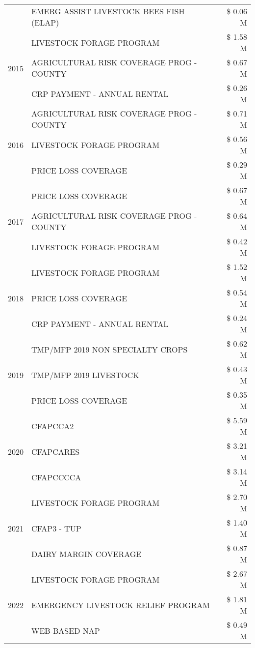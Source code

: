 \begin{tabular}{llr}
 & EMERG ASSIST LIVESTOCK BEES FISH (ELAP) & \$ 0.06 M \\
\cline{1-3}
\multirow[t]{3}{*}{2015} & LIVESTOCK FORAGE PROGRAM & \$ 1.58 M \\
 & AGRICULTURAL RISK COVERAGE PROG - COUNTY & \$ 0.67 M \\
 & CRP PAYMENT - ANNUAL RENTAL & \$ 0.26 M \\
\cline{1-3}
\multirow[t]{3}{*}{2016} & AGRICULTURAL RISK COVERAGE PROG - COUNTY & \$ 0.71 M \\
 & LIVESTOCK FORAGE PROGRAM & \$ 0.56 M \\
 & PRICE LOSS COVERAGE & \$ 0.29 M \\
\cline{1-3}
\multirow[t]{3}{*}{2017} & PRICE LOSS COVERAGE & \$ 0.67 M \\
 & AGRICULTURAL RISK COVERAGE PROG - COUNTY & \$ 0.64 M \\
 & LIVESTOCK FORAGE PROGRAM & \$ 0.42 M \\
\cline{1-3}
\multirow[t]{3}{*}{2018} & LIVESTOCK FORAGE PROGRAM & \$ 1.52 M \\
 & PRICE LOSS COVERAGE & \$ 0.54 M \\
 & CRP PAYMENT - ANNUAL RENTAL & \$ 0.24 M \\
\cline{1-3}
\multirow[t]{3}{*}{2019} & TMP/MFP 2019 NON SPECIALTY CROPS & \$ 0.62 M \\
 & TMP/MFP 2019 LIVESTOCK & \$ 0.43 M \\
 & PRICE LOSS COVERAGE & \$ 0.35 M \\
\cline{1-3}
\multirow[t]{3}{*}{2020} & CFAPCCA2 & \$ 5.59 M \\
 & CFAPCARES & \$ 3.21 M \\
 & CFAPCCCCA & \$ 3.14 M \\
\cline{1-3}
\multirow[t]{3}{*}{2021} & LIVESTOCK FORAGE PROGRAM & \$ 2.70 M \\
 & CFAP3 - TUP & \$ 1.40 M \\
 & DAIRY MARGIN COVERAGE & \$ 0.87 M \\
\cline{1-3}
\multirow[t]{3}{*}{2022} & LIVESTOCK FORAGE PROGRAM & \$ 2.67 M \\
 & EMERGENCY LIVESTOCK RELIEF PROGRAM & \$ 1.81 M \\
 & WEB-BASED NAP & \$ 0.49 M \\
\cline{1-3}
\bottomrule
\end{tabular}
